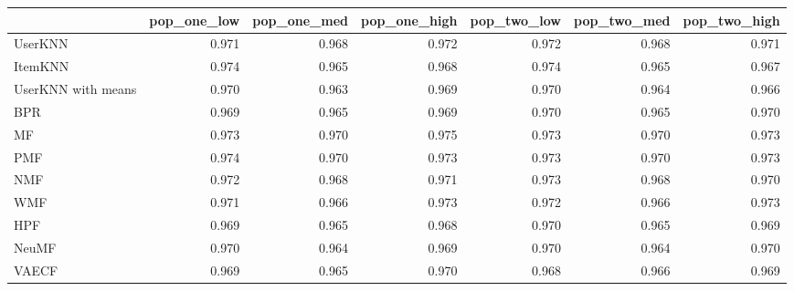 \begin{tabular}{lrrrrrr}
\toprule
{} &  pop\_one\_low &  pop\_one\_med &  pop\_one\_high &  pop\_two\_low &  pop\_two\_med &  pop\_two\_high \\
\midrule
UserKNN            &        0.971 &        0.968 &         0.972 &        0.972 &        0.968 &         0.971 \\
ItemKNN            &        0.974 &        0.965 &         0.968 &        0.974 &        0.965 &         0.967 \\
UserKNN with means &        0.970 &        0.963 &         0.969 &        0.970 &        0.964 &         0.966 \\
BPR                &        0.969 &        0.965 &         0.969 &        0.970 &        0.965 &         0.970 \\
MF                 &        0.973 &        0.970 &         0.975 &        0.973 &        0.970 &         0.973 \\
PMF                &        0.974 &        0.970 &         0.973 &        0.973 &        0.970 &         0.973 \\
NMF                &        0.972 &        0.968 &         0.971 &        0.973 &        0.968 &         0.970 \\
WMF                &        0.971 &        0.966 &         0.973 &        0.972 &        0.966 &         0.973 \\
HPF                &        0.969 &        0.965 &         0.968 &        0.970 &        0.965 &         0.969 \\
NeuMF              &        0.970 &        0.964 &         0.969 &        0.970 &        0.964 &         0.970 \\
VAECF              &        0.969 &        0.965 &         0.970 &        0.968 &        0.966 &         0.969 \\
\bottomrule
\end{tabular}
